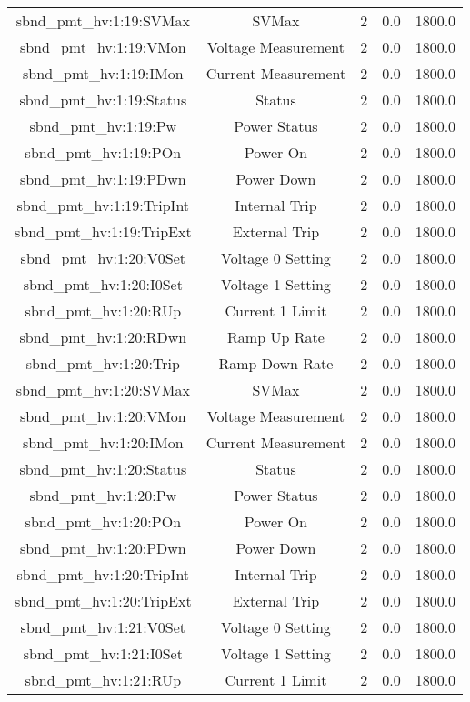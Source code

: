 \begin{center}
\begin{longtable}{c | c c c c }
sbnd\_pmt\_hv:1:19:SVMax & SVMax & 2 & 0.0 & 1800.0\\ 
sbnd\_pmt\_hv:1:19:VMon & Voltage Measurement & 2 & 0.0 & 1800.0\\ 
sbnd\_pmt\_hv:1:19:IMon & Current Measurement & 2 & 0.0 & 1800.0\\ 
sbnd\_pmt\_hv:1:19:Status & Status & 2 & 0.0 & 1800.0\\ 
sbnd\_pmt\_hv:1:19:Pw & Power Status & 2 & 0.0 & 1800.0\\ 
sbnd\_pmt\_hv:1:19:POn & Power On & 2 & 0.0 & 1800.0\\ 
sbnd\_pmt\_hv:1:19:PDwn & Power Down & 2 & 0.0 & 1800.0\\ 
sbnd\_pmt\_hv:1:19:TripInt & Internal Trip & 2 & 0.0 & 1800.0\\ 
sbnd\_pmt\_hv:1:19:TripExt & External Trip & 2 & 0.0 & 1800.0\\ 
sbnd\_pmt\_hv:1:20:V0Set & Voltage 0 Setting & 2 & 0.0 & 1800.0\\ 
sbnd\_pmt\_hv:1:20:I0Set & Voltage 1 Setting & 2 & 0.0 & 1800.0\\ 
sbnd\_pmt\_hv:1:20:RUp & Current 1 Limit & 2 & 0.0 & 1800.0\\ 
sbnd\_pmt\_hv:1:20:RDwn & Ramp Up Rate & 2 & 0.0 & 1800.0\\ 
sbnd\_pmt\_hv:1:20:Trip & Ramp Down Rate & 2 & 0.0 & 1800.0\\ 
sbnd\_pmt\_hv:1:20:SVMax & SVMax & 2 & 0.0 & 1800.0\\ 
sbnd\_pmt\_hv:1:20:VMon & Voltage Measurement & 2 & 0.0 & 1800.0\\ 
sbnd\_pmt\_hv:1:20:IMon & Current Measurement & 2 & 0.0 & 1800.0\\ 
sbnd\_pmt\_hv:1:20:Status & Status & 2 & 0.0 & 1800.0\\ 
sbnd\_pmt\_hv:1:20:Pw & Power Status & 2 & 0.0 & 1800.0\\ 
sbnd\_pmt\_hv:1:20:POn & Power On & 2 & 0.0 & 1800.0\\ 
sbnd\_pmt\_hv:1:20:PDwn & Power Down & 2 & 0.0 & 1800.0\\ 
sbnd\_pmt\_hv:1:20:TripInt & Internal Trip & 2 & 0.0 & 1800.0\\ 
sbnd\_pmt\_hv:1:20:TripExt & External Trip & 2 & 0.0 & 1800.0\\ 
sbnd\_pmt\_hv:1:21:V0Set & Voltage 0 Setting & 2 & 0.0 & 1800.0\\ 
sbnd\_pmt\_hv:1:21:I0Set & Voltage 1 Setting & 2 & 0.0 & 1800.0\\ 
sbnd\_pmt\_hv:1:21:RUp & Current 1 Limit & 2 & 0.0 & 1800.0\\ 

\end{longtable}
\end{center}
